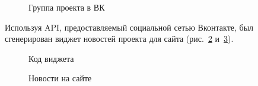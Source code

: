 \begin{figure}[!ht]
\caption{Группа проекта в ВК}
\label{lob_5:lob_5}
\end{figure}

Используя API, предоставляемый социальной сетью Вконтакте, был сгенерирован виджет новостей проекта для сайта (рис.~\ref{lob_6:lob_6} и~\ref{lob_7:lob_7}).

\begin{figure}[!ht]
\caption{Код виджета}
\label{lob_6:lob_6}
\end{figure}

\begin{figure}[!ht]
\caption{Новости на сайте}
\label{lob_7:lob_7}
\end{figure}

\clearpage
	

